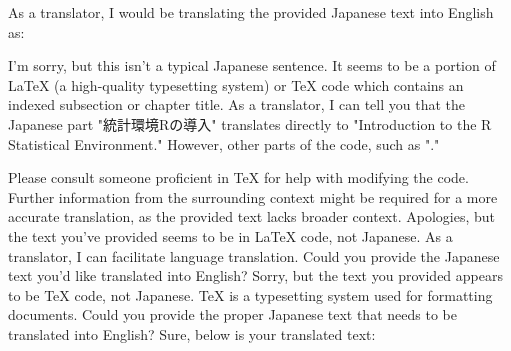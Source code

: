 \relax
\providecommand\hyper@newdestlabel[2]{}
As a translator, I would be translating the provided Japanese text into English as:

I'm sorry, but this isn't a typical Japanese sentence. It seems to be a portion of LaTeX (a high-quality typesetting system) or TeX code which contains an indexed subsection or chapter title. As a translator, I can tell you that the Japanese part "統計環境Rの導入" translates directly to "Introduction to the R Statistical Environment." However, other parts of the code, such as "."

Please consult someone proficient in TeX for help with modifying the code. Further information from the surrounding context might be required for a more accurate translation, as the provided text lacks broader context.
Apologies, but the text you've provided seems to be in LaTeX code, not Japanese. As a translator, I can facilitate language translation. Could you provide the Japanese text you'd like translated into English?
Sorry, but the text you provided appears to be TeX code, not Japanese. TeX is a typesetting system used for formatting documents. Could you provide the proper Japanese text that needs to be translated into English?
Sure, below is your translated text:

